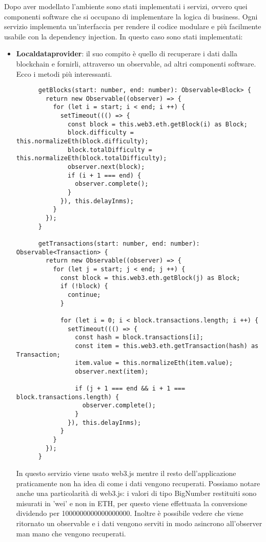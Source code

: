 Dopo aver modellato l'ambiente sono stati implementati i servizi, ovvero quei componenti software che si occupano di implementare la logica di business.
Ogni servizio implementa un'interfaccia per rendere il codice modulare e più facilmente usabile con la dependency injection.
In questo caso sono stati implementati:
\begin{itemize}
    \item {\bfseries Localdataprovider}: il suo compito è quello di recuperare i dati dalla blockchain e fornirli, attraverso un observable, ad altri componenti software.
    Ecco i metodi più interessanti.

    \begin{lstlisting}
      getBlocks(start: number, end: number): Observable<Block> {
        return new Observable((observer) => {
          for (let i = start; i < end; i ++) {
            setTimeout((() => {
              const block = this.web3.eth.getBlock(i) as Block;
              block.difficulty = this.normalizeEth(block.difficulty);
              block.totalDifficulty = this.normalizeEth(block.totalDifficulty);
              observer.next(block);
              if (i + 1 === end) {
                observer.complete();
              }
            }), this.delayInms);
          }
        });
      }

      getTransactions(start: number, end: number): Observable<Transaction> {
        return new Observable((observer) => {
          for (let j = start; j < end; j ++) {
            const block = this.web3.eth.getBlock(j) as Block;
            if (!block) {
              continue;
            }

            for (let i = 0; i < block.transactions.length; i ++) {
              setTimeout((() => {
                const hash = block.transactions[i];
                const item = this.web3.eth.getTransaction(hash) as Transaction;
                item.value = this.normalizeEth(item.value);
                observer.next(item);

                if (j + 1 === end && i + 1 === block.transactions.length) {
                  observer.complete();
                }
              }), this.delayInms);
            }
          }
        });
      }
    \end{lstlisting}
    In questo servizio viene usato web3.js mentre il resto dell'applicazione praticamente non ha idea di come i dati vengono recuperati.
    Possiamo notare anche una particolarità di web3.js: i valori di tipo BigNumber restituiti sono misurati in 'wei' e non in ETH, per questo viene effettuata la conversione dividendo per 1000000000000000000.
    Inoltre è possibile vedere che viene ritornato un observable e i dati vengono serviti in modo asincrono all'observer man mano che vengono recuperati.


\end{itemize}
